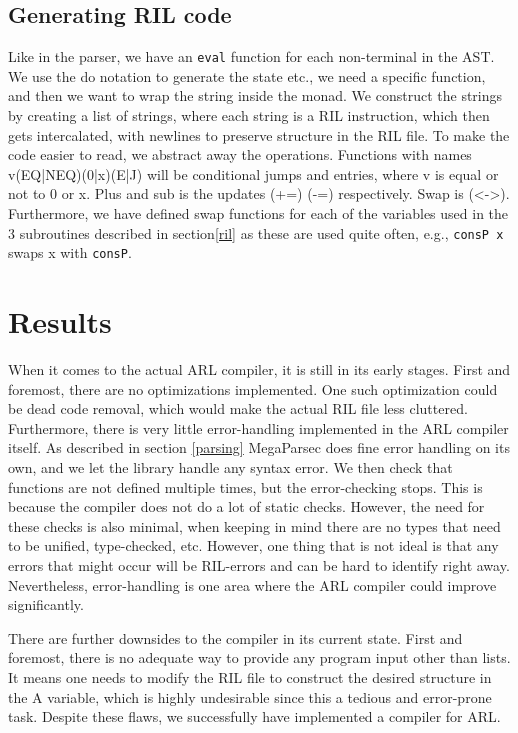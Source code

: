 \documentclass[a4paper]{article}
\begin{document}
\subsection{Generating RIL code}
\label{sec:org57ffa3e}
Like in the parser, we have an \texttt{eval} function for each non-terminal in the AST. We use the do notation to generate the state etc., we need a specific function, and then we want to wrap the string inside the monad. We construct the strings by creating a list of strings, where each string is a RIL instruction, which then gets intercalated, with newlines to preserve structure in the RIL file. To make the code easier to read, we abstract away the operations. Functions with names v(EQ|NEQ)(0|x)(E|J) will be conditional jumps and entries, where v is equal or not to 0 or x. Plus and sub is the updates (+=) (-=) respectively. Swap is (<->). Furthermore, we have defined swap functions for each of the variables used in the 3 subroutines described in section\ref{ril} as these are used quite often, e.g., \texttt{consP x} swaps x with \texttt{consP}.

\section{Results}
\label{sec:org9631d40}
When it comes to the actual ARL compiler, it is still in its early stages. First and foremost, there are no optimizations implemented. One such optimization could be dead code removal, which would make the actual RIL file less cluttered. Furthermore, there is very little error-handling implemented in the ARL compiler itself. As described in section \ref{parsing} MegaParsec does fine error handling on its own, and we let the library handle any syntax error. We then check that functions are not defined multiple times, but the error-checking stops. This is because the compiler does not do a lot of static checks. However, the need for these checks is also minimal, when keeping in mind there are no types that need to be unified, type-checked, etc. However, one thing that is not ideal is that any errors that might occur will be RIL-errors and can be hard to identify right away. Nevertheless, error-handling is one area where the ARL compiler could improve significantly.

There are further downsides to the compiler in its current state. First and foremost, there is no adequate way to provide any program input other than lists. It means one needs to modify the RIL file to construct the desired structure in the A variable, which is highly undesirable since this a tedious and error-prone task. Despite these flaws, we successfully have implemented a compiler for ARL.
\end{document}
